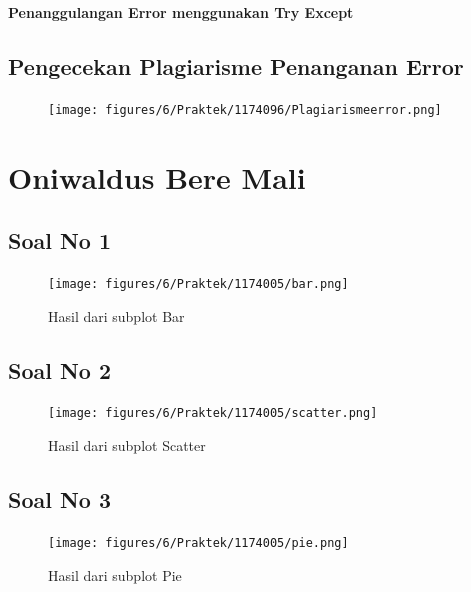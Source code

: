 \textbf{Penanggulangan Error menggunakan Try Except}


\subsection{Pengecekan Plagiarisme Penanganan Error}
\begin{figure}[H]
	\texttt{[image: figures/6/Praktek/1174096/Plagiarismeerror.png]}
	\centering
\end{figure}


\section{Oniwaldus Bere Mali}
\subsection{Soal No 1}



\begin{figure}[h]
\centering
\texttt{[image: figures/6/Praktek/1174005/bar.png]}
\caption{Hasil dari subplot Bar}
\label{fig:contoh}
\end{figure}

\subsection{Soal No 2}



\begin{figure}[h]
\centering
\texttt{[image: figures/6/Praktek/1174005/scatter.png]}
\caption{Hasil dari subplot Scatter}
\label{fig:contoh}
\end{figure}

\subsection{Soal No 3}



\begin{figure}[h]
\centering
\texttt{[image: figures/6/Praktek/1174005/pie.png]}
\caption{Hasil dari subplot Pie}
\label{fig:contoh}
\end{figure}

